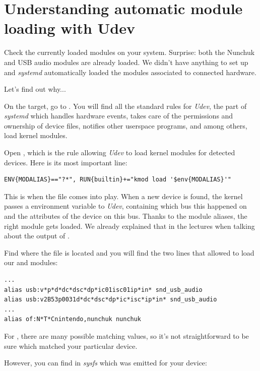 \section{Understanding automatic module loading with Udev}

Check the currently loaded modules on your system. Surprise: both
the Nunchuk and USB audio modules are already loaded.
We didn't have anything to set up and {\em systemd} automatically loaded
the modules associated to connected hardware.

Let's find out why...

On the target, go to . You will find all the
standard rules for {\em Udev}, the part of {\em systemd} which handles
hardware events, takes care of the permissions and ownership of device
files, notifies other userspace programs, and among others, load
kernel modules.

Open , which is the rule allowing {\em Udev}
to load kernel modules for detected devices. Here is its most important
line:

\begin{verbatim}
ENV{MODALIAS}=="?*", RUN{builtin}+="kmod load '$env{MODALIAS}'"
\end{verbatim}

This is when the  file comes into play.
When a new device is found, the kernel passes a 
environment variable to {\em Udev}, containing which bus this
happened on and the attributes of the device on this bus.
Thanks to the module aliases, the right module gets loaded.
We already explained that in the lectures when talking about
the output of .

Find where the  file is located and
you will find the two lines that allowed to load our
 and  modules:

\begin{verbatim}
...
alias usb:v*p*d*dc*dsc*dp*ic01isc01ip*in* snd_usb_audio
alias usb:v2B53p0031d*dc*dsc*dp*ic*isc*ip*in* snd_usb_audio
...
alias of:N*T*Cnintendo,nunchuk nunchuk

\end{verbatim}

For , there are many possible matching values,
so it's not straightforward to be sure which matched your particular
device.

However, you can find in {\em sysfs} which 
was emitted for your device:

